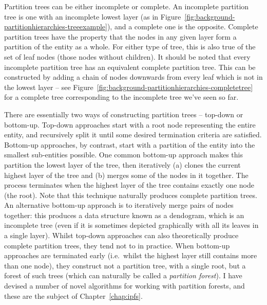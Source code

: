 
Partition trees can be either incomplete or complete. An incomplete partition tree is one with an incomplete lowest layer (as in Figure~\ref{fig:background-partitionhierarchies-treeexample}), and a complete one is the opposite. Complete partition trees have the property that the nodes in any given layer form a partition of the entity as a whole. For either type of tree, this is also true of the set of leaf nodes (those nodes without children). It should be noted that every incomplete partition tree has an equivalent complete partition tree. This can be constructed by adding a chain of nodes downwards from every leaf which is not in the lowest layer -- see Figure~\ref{fig:background-partitionhierarchies-completetree} for a complete tree corresponding to the incomplete tree we've seen so far.


There are essentially two ways of constructing partition trees -- top-down or bottom-up. Top-down approaches start with a root node representing the entire entity, and recursively split it until some desired termination criteria are satisfied. Bottom-up approaches, by contrast, start with a partition of the entity into the smallest sub-entities possible. One common bottom-up approach makes this partition the lowest layer of the tree, then iteratively (a) clones the current highest layer of the tree and (b) merges some of the nodes in it together. The process terminates when the highest layer of the tree contains exactly one node (the root). Note that this technique naturally produces complete partition trees. An alternative bottom-up approach is to iteratively merge pairs of nodes together: this produces a data structure known as a dendogram, which is an incomplete tree (even if it is sometimes depicted graphically with all its leaves in a single layer). Whilst top-down approaches can also theoretically produce complete partition trees, they tend not to in practice. When bottom-up approaches are terminated early (i.e.~whilst the highest layer still contains more than one node), they construct not a partition tree, with a single root, but a forest of such trees (which can naturally be called a \emph{partition forest}). I have devised a number of novel algorithms for working with partition forests, and these are the subject of Chapter~\ref{chap:ipfs}.


